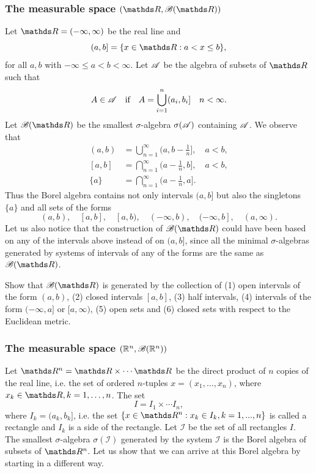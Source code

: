 \subsubsection{The measurable space $(\R, \B(\R))$}
Let $\R = (-\infty, \infty)$ be the real line and
\begin{equation*}
    (a,b] = \{ x \in \R : a < x \le b \},
\end{equation*}
for all $a,b$ with $-\infty \le a < b < \infty$. Let $\mathcal{A}$ be the algebra of subsets of $\R$ such that
\begin{equation*}
    A \in \mathcal{A} \quad \text{if} \quad  A = \bigcup_{i=1}^n (a_i, b_i] \quad n <\infty.
\end{equation*}
Let $\B(\R)$ be the smallest $\sigma$-algebra $\sigma(\mathcal{A})$ containing $\mathcal{A}$. We observe that 
\begin{align*}
    (a,b) &= \bigcup_{n=1}^\infty \bigg(a,b-\frac{1}{n} \bigg], \quad a<b,\\
    [a,b] &= \bigcap_{n=1}^\infty \bigg(a - \frac{1}{n},b\bigg], \quad a<b,\\
    \{a\} &= \bigcap_{n=1}^\infty \bigg(a - \frac{1}{n},a\bigg].
\end{align*}
Thus the Borel algebra contains not only intervals $(a,b]$ but also the singletons $\{ a\}$ and all sets of the forms 
\begin{equation*}
    (a,b), \quad [a,b], \quad [a,b), \quad (-\infty,b), \quad (-\infty,b], \quad (a,\infty).
\end{equation*}
Let us also notice that the construction of $\B(\R)$ could have been based on any of the intervals above instead of on $(a, b]$, since all the minimal $\sigma$-algebras generated by systems of intervals of any of the forms are the same as $\B(\R)$.

\begin{exercise}
Show that $\B(\R)$ is generated by the collection of (1) open intervals of the form $(a,b)$, (2) closed intervals $[a,b]$, (3) half intervals, (4) intervals of the form $(-\infty, a]$ or $[a,\infty)$, (5) open sets and (6) closed sets with respect to the Euclidean metric.
\end{exercise}

\subsubsection{The measurable space $(\mathbb{R}^n, \mathcal{B}(\mathbb{R}^n))$}
Let $\R^n = \R \times \cdots \R$ be the direct product of $n$ copies of the real line, i.e. the set of ordered $n$-tuples $x = (x_1,\dots,x_n)$, where $x_k \in \R, k = 1,\dots, n$. The set
\begin{equation*}
    I = I_1 \times \cdots I_n,
\end{equation*}
where $I_k = (a_k,b_k]$, i.e. the set $\{x\in \R^n: x_k \in I_k, k=1,...,n \}$ is called a rectangle and $I_k$ is a side of the rectangle. Let $\mathcal{I}$ be the set of all rectangles $I$. The smallest $\sigma$-algebra $\sigma(\mathcal{I})$ generated by the system $\mathcal{I}$ is the Borel algebra of subsets of $\R^n$. Let us show that we can arrive at this Borel algebra by starting in a different way.
\newline

